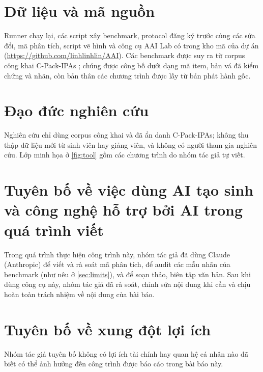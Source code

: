 \section*{Dữ liệu và mã nguồn}
Runner chạy lại, các script xây benchmark, protocol đăng ký trước cùng các sửa đổi, mã phân tích, script vẽ hình và công cụ AAI Lab có trong kho mã của dự án (\url{https://github.com/linhlinhlin/AAI}). Các benchmark được suy ra từ corpus công khai C-Pack-IPAs \citep{orvalho2024cpack}; chúng được công bố dưới dạng mã item, bản vá đã kiểm chứng và nhãn, còn bản thân các chương trình được lấy từ bản phát hành gốc.

\section*{Đạo đức nghiên cứu}
Nghiên cứu chỉ dùng corpus công khai và đã ẩn danh C-Pack-IPAs; không thu thập dữ liệu mới từ sinh viên hay giảng viên, và không có người tham gia nghiên cứu. Lớp minh họa ở \cref{fig:tool} gồm các chương trình do nhóm tác giả tự viết.

\section*{Tuyên bố về việc dùng AI tạo sinh và công nghệ hỗ trợ bởi AI trong quá trình viết}
Trong quá trình thực hiện công trình này, nhóm tác giả đã dùng Claude (Anthropic) để viết và rà soát mã phân tích, để audit các mẫu nhãn của benchmark (như nêu ở \cref{sec:limits}), và để soạn thảo, biên tập văn bản. Sau khi dùng công cụ này, nhóm tác giả đã rà soát, chỉnh sửa nội dung khi cần và chịu hoàn toàn trách nhiệm về nội dung của bài báo.

\section*{Tuyên bố về xung đột lợi ích}
Nhóm tác giả tuyên bố không có lợi ích tài chính hay quan hệ cá nhân nào đã biết có thể ảnh hưởng đến công trình được báo cáo trong bài báo này.
